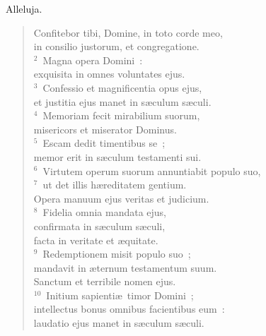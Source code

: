 \lettrine[lines=3,image=true,loversize=0.05,lraise=-0.03]{A}{}lleluja. \begin{flushleft}\begin{verse}\vspace{6pt}Confitebor tibi, Domine, in toto corde meo,\\ in consilio justorum, et congregatione.\\
${}^{2}$~Magna opera Domini~:\\ exquisita in omnes voluntates ejus.\\
${}^{3}$~Confessio et magnificentia opus ejus,\\ et justitia ejus manet in s\ae culum s\ae culi.\\
${}^{4}$~Memoriam fecit mirabilium suorum,\\ misericors et miserator Dominus.\\
${}^{5}$~Escam dedit timentibus se~;\\ memor erit in s\ae culum testamenti sui.\\
${}^{6}$~Virtutem operum suorum annuntiabit populo suo,\\
${}^{7}$~ut det illis h\ae reditatem gentium.\\ Opera manuum ejus veritas et judicium.\\
${}^{8}$~Fidelia omnia mandata ejus,\\ confirmata in s\ae culum s\ae culi,\\ facta in veritate et \ae quitate.\\
${}^{9}$~Redemptionem misit populo suo~;\\ mandavit in \ae ternum testamentum suum.\\ Sanctum et terribile nomen ejus.\\
${}^{10}$~Initium sapienti\ae\ timor Domini~;\\ intellectus bonus omnibus facientibus eum~:\\ laudatio ejus manet in s\ae culum s\ae culi.\end{verse}\end{flushleft}



